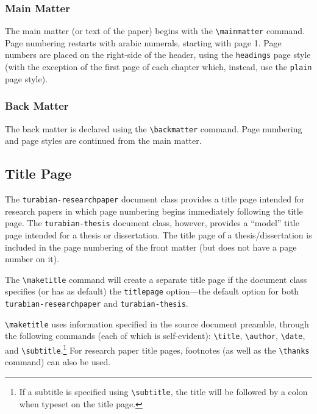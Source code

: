\documentclass{article}
\newcommand{\textcmd}[1]{\texttt{\textbackslash #1}}
\begin{document}
\subsubsection*{Main Matter}

The main matter (or text of the paper) begins with the \textcmd{mainmatter} command. Page numbering restarts with arabic numerals, starting with page 1. Page numbers are placed on the right-side of the header, using the \texttt{headings} page style (with the exception of the first page of each chapter which, instead, use the \texttt{plain} page style).\autocite[386, 400]{turabian_manual_2018}

\subsubsection*{Back Matter}

The back matter is declared using the \textcmd{backmatter} command. Page numbering and page styles are continued from the main matter.\autocite[405]{turabian_manual_2018}


\subsection{Title Page}
\label{subsec:titlepage}

The \texttt{turabian-researchpaper} document class provides a title page intended for research papers in which page numbering begins immediately following the title page. The \texttt{turabian-thesis} document class, however, provides a ``model'' title page intended for a thesis or dissertation. The title page of a thesis/dissertation is included in the page numbering of the front matter (but does not have a page number on it).\autocite[385--386, 388]{turabian_manual_2018}

The \textcmd{maketitle} command will create a separate title page if the document class specifies (or has as default) the \texttt{titlepage} option---the default option for both \texttt{turabian-researchpaper} and \texttt{turabian-thesis}.

\textcmd{maketitle} uses information specified in the source document preamble, through the following commands (each of which is self-evident): \textcmd{title}, \textcmd{author}, \textcmd{date}, and \textcmd{subtitle}.\footnote{%
	If a subtitle is specified using \textcmd{subtitle}, the title will be followed by a colon when typeset on the title page.}
For research paper title pages, footnotes (as well as the \textcmd{thanks} command) can also be used.
\end{document}
